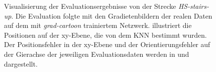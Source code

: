 \begin{figure}
\begin{tabularx}{0.9\textwidth}{>{\centering\arraybackslash}p{} X}
	\end{tabularx}
	\caption{Visualisierung der Evaluationsergebnisse von der Strecke \textit{HS-stairs-up}. Die Evaluation folgte mit den Gradietenbildern der realen Daten auf dem mit \textit{grad-cartoon} trainiertem Netzwerk.  illustriert die Positionen auf der xy-Ebene, die von dem KNN bestimmt wurden. Der Positionsfehler in der xy-Ebene und der Orientierungsfehler auf der Gierachse der jeweiligen Evaluationsdaten werden in   und   dargestellt.}
	\label{fig:result_hs_stairs_down}
\end{figure}





